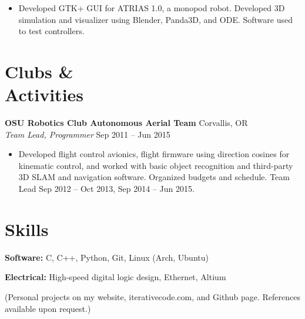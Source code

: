\documentclass[10pt,letterpaper,margin]{res}
\newcommand{\org}[2]{{\bf #1} \hfill {\color{lightgray} #2} \\}
\newcommand{\pos}[2]{{\it #1} \hfill {\color{lightgray} #2} \vspace{0.0em}}
\begin{document}
\begin{resume}
\begin{itemize}
    \item Developed GTK+ GUI for ATRIAS 1.0, a monopod robot. Developed 3D
        simulation and visualizer using Blender, Panda3D, and ODE. Software
        used to test controllers.
\end{itemize}



\section{Clubs \& \\ Activities}

\org {OSU Robotics Club Autonomous Aerial Team} {Corvallis, OR}
\pos {Team Lead, Programmer} {Sep 2011 -- Jun 2015}

\begin{itemize}
    \item Developed flight control avionics, flight firmware using direction
      cosines for kinematic control, and worked with basic object recognition
      and third-party 3D SLAM and navigation software. Organized budgets and
      schedule. Team Lead Sep 2012 -- Oct 2013, Sep 2014 -- Jun 2015.
\end{itemize}



%
%


\section{Skills}

{\bf Software:} C, C++, Python, Git, Linux (Arch, Ubuntu)

{\bf Electrical:} High-speed digital logic design, Ethernet, Altium


\vspace{0.5em}
{\footnotesize (Personal projects on my website, iterativecode.com, and Github
page. References available upon request.)}

% 

\end{resume}
\end{document}
